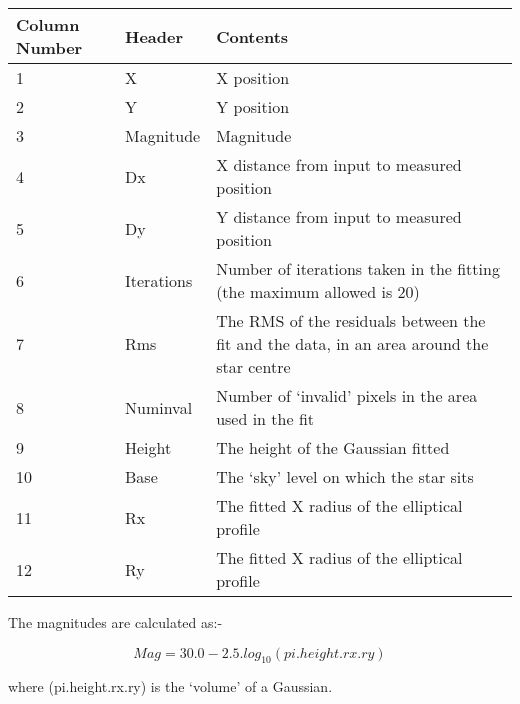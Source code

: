 {{ \begin{tabular}{|l|l|p{3in}|}\hline
  Column Number & Header & Contents \\ \hline
    1 & X         & X position \\
    2 & Y         & Y position \\
    3 & Magnitude & Magnitude \\
    4 & Dx        & X distance from input to measured position \\
    5 & Dy        & Y distance from input to measured position \\
    6 & Iterations & Number of iterations taken in the fitting
                     (the maximum allowed is 20) \\
    7 & Rms       & The RMS of the residuals between the fit and the
                    data, in an area around the star centre \\
    8 & Numinval  & Number of `invalid' pixels in the area used
                    in the fit\\
    9 & Height    & The height of the Gaussian fitted \\
   10 & Base      & The `sky' level on which the star sits \\
   11 & Rx        & The fitted X radius of the elliptical profile \\
   12 & Ry        & The fitted X radius of the elliptical profile \\ 
                    \hline
 \end{tabular}
                                                                               
  The magnitudes are calculated as:-
                                                                               
     $$   Mag = 30.0 - 2.5.log_{10}(pi.height.rx.ry) $$
                                                                               
  where (pi.height.rx.ry) is the `volume' of a Gaussian.
                                                                               
                                                                               
}}
